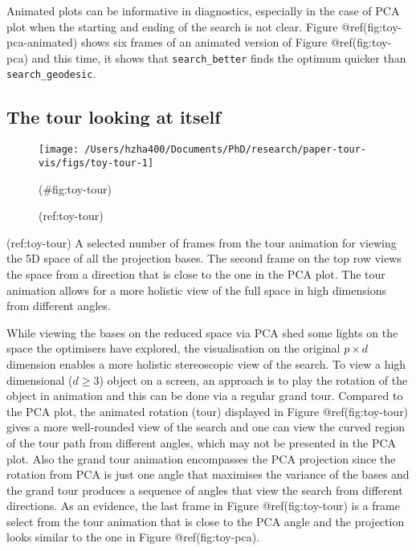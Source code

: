 Animated plots can be informative in diagnostics, especially in the case of PCA plot when the starting and ending of the search is not clear. Figure @ref(fig:toy-pca-animated) shows six frames of an animated version of Figure @ref(fig:toy-pca) and this time, it shows that \texttt{search\_better} finds the optimum quicker than \texttt{search\_geodesic}.

\hypertarget{the-tour-looking-at-itself}{%
\subsection{The tour looking at itself}\label{the-tour-looking-at-itself}}

\begin{Schunk}
\begin{figure}

{\centering \texttt{[image: /Users/hzha400/Documents/PhD/research/paper-tour-vis/figs/toy-tour-1]} 

}

\caption[(ref:toy-tour)]{(ref:toy-tour)}(\#fig:toy-tour)
\end{figure}
\end{Schunk}

(ref:toy-tour) A selected number of frames from the tour animation for viewing the 5D space of all the projection bases. The second frame on the top row views the space from a direction that is close to the one in the PCA plot. The tour animation allows for a more holistic view of the full space in high dimensions from different angles.

While viewing the bases on the reduced space via PCA shed some lights on the space the optimisers have explored, the visualisation on the original \(p \times d\) dimension enables a more holistic stereoscopic view of the search. To view a high dimensional (\(d \ge 3\)) object on a screen, an approach is to play the rotation of the object in animation and this can be done via a regular grand tour. Compared to the PCA plot, the animated rotation (tour) displayed in Figure @ref(fig:toy-tour) gives a more well-rounded view of the search and one can view the curved region of the tour path from different angles, which may not be presented in the PCA plot. Also the grand tour animation encompasses the PCA projection since the rotation from PCA is just one angle that maximises the variance of the bases and the grand tour produces a sequence of angles that view the search from different directions. As an evidence, the last frame in Figure @ref(fig:toy-tour) is a frame select from the tour animation that is close to the PCA angle and the projection looks similar to the one in Figure @ref(fig:toy-pca).

